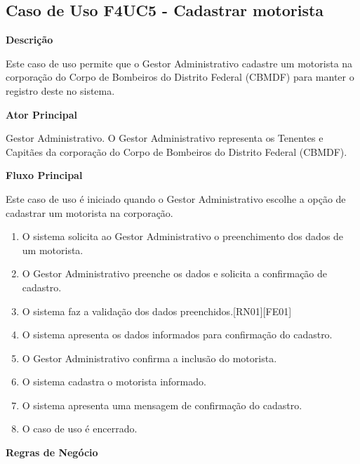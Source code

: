 
  \subsection{Caso de Uso F4UC5 - Cadastrar motorista}

  {\raggedright
      \textbf{Descrição}
  }

    Este caso de uso permite que o Gestor Administrativo cadastre um motorista na corporação do Corpo de Bombeiros do Distrito Federal
    (CBMDF) para manter o registro deste no sistema.
    
  {\raggedright
      \textbf{Ator Principal}
  }

    Gestor Administrativo. O Gestor Administrativo representa os Tenentes e Capitães da corporação do Corpo de Bombeiros do Distrito
    Federal (CBMDF).

  {\raggedright
      \textbf{Fluxo Principal}
  }
  
    Este caso de uso é iniciado quando o Gestor Administrativo escolhe a opção de cadastrar um motorista na corporação.
    
  
  \begin{enumerate}
    \item O sistema solicita ao Gestor Administrativo o preenchimento dos dados de um motorista.
    \item O Gestor Administrativo preenche os dados e solicita a confirmação de cadastro.
    \item O sistema faz a validação dos dados preenchidos.[RN01][FE01]
    \item O sistema apresenta os dados informados para confirmação do cadastro.
    \item O Gestor Administrativo confirma a inclusão do motorista.
    \item O sistema cadastra o motorista informado.
    \item O sistema apresenta uma mensagem de confirmação do cadastro.
    \item O caso de uso é encerrado.
    
  \end{enumerate}
  
  
   {\raggedright
      \textbf{Regras de Negócio}
  }
  
  

  